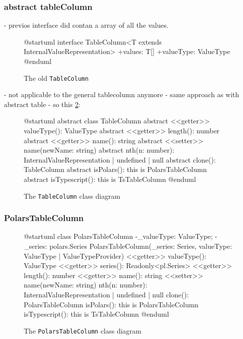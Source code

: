 \subsubsection{abstract tableColumn}
- previos interface did contan a array of all the values.
\begin{figure}
	\begin{plantuml}
		@startuml
		interface TableColumn<T extends InternalValueRepresentation>{
				+values: T[]
				+valueType: ValueType
			}
		@enduml
	\end{plantuml}
	\caption{The old \Verb|TableColumn|}
	\label{fig:uml:old_tablecolumn}
\end{figure}
- not applicable to the general tablecolumn anymore
- same approach as with abstract table
- so this \ref{fig:uml:tablecolumn}:
\begin{figure}
	\begin{plantuml}
		@startuml
		abstract class TableColumn{
				{abstract} <<getter>> valueType(): ValueType
					{abstract} <<getter>> length(): number
					{abstract} <<getter>> name(): string
					{abstract} <<setter>> name(newName: string)
				{abstract} nth(n: number): InternalValueRepresentation | undefined | null
					{abstract} clone(): TableColumn
					{abstract} isPolars(): this is PolarsTableColumn
					{abstract} isTypescript(): this is TsTableColumn
			}
		@enduml
	\end{plantuml}
	\caption{The \Verb|TableColumn| class diagram}
	\label{fig:uml:tablecolumn}
\end{figure}

\subsubsection{PolarsTableColumn}
\begin{figure}
	\begin{plantuml}
		@startuml
		class PolarsTableColumn {
				-_valueType: ValueType;
				-_series: polars.Series
				PolarsTableColumn(_series: Series, valueType: ValueType | ValueTypeProvider)
				<<getter>> valueType(): ValueType
				<<getter>> series(): Readonly<pl.Series>
				<<getter>> length(): number
				<<getter>> name(): string
				<<setter>> name(newName: string)
				nth(n: number): InternalValueRepresentation | undefined | null
				clone(): PolarsTableColumn
				isPolars(): this is PolarsTableColumn
				isTypescript(): this is TsTableColumn
			}
		@enduml
	\end{plantuml}
	\caption{The \Verb|PolarsTableColumn| class diagram}
	\label{fig:uml:polastablecolumn}
\end{figure}

